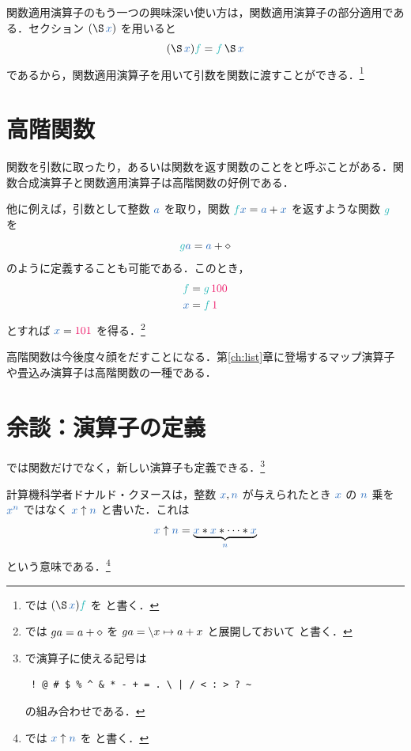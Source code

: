 \documentclass[a5paper,twoside,fleqn,draft]{jsbook}
\begin{document}
関数適用演算子のもう一つの興味深い使い方は，関数適用演算子の部分適用である．セクション $(\hApply\hVar{x})$ を用いると
\begin{equation}
  (\hApply\hVar{x})\hFunc{f}
  =\hFunc{f}\hApply\hVar{x}
\end{equation}
であるから，関数適用演算子を用いて引数を関数に渡すことができる．\footnote{\haskell では $(\hApply\hVar{x})\hFunc{f}$ を  と書く．}

\section{高階関数}

関数を引数に取ったり，あるいは関数を返す関数のことをと呼ぶことがある．関数合成演算子と関数適用演算子は高階関数の好例である．

他に例えば，引数として整数 $\hVar{a}$ を取り，関数 $\hFunc{f}\hVar{x}=\hVar{a}+\hVar{x}$ を返すような関数 $\hFunc{g}$ を
\begin{equation}
  \hFunc{g}\hVar{a}
  =\hVar{a}+\hAnonParam
\end{equation}
のように定義することも可能である．このとき，
\begin{align}
  \hFunc{f}
  &=\hFunc{g}\,\hConstant{100}\\
  \hVar{x}
  &=\hFunc{f}\,\hConstant{1}
\end{align}
とすれば $\hVar{x}=\hConstant{101}$ を得る．\footnote{\haskell では $ga=a+\diamond$ を $ga=\backslash x\mapsto a+x$ と展開しておいて  と書く．}

高階関数は今後度々顔をだすことになる．第\ref{ch:list}章に登場するマップ演算子や畳込み演算子は高階関数の一種である．

\section{余談：演算子の定義}

\haskell では関数だけでなく，新しい演算子も定義できる．\footnote{\haskell で演算子に使える記号は
\begin{verbatim}
 ! @ # $ % ^ & * - + = . \ | / < : > ? ~
\end{verbatim}%
の組み合わせである．}


計算機科学者ドナルド・クヌースは，整数 $\hVar{x},\hVar{n}$ が与えられたとき $\hVar{x}$ の $\hVar{n}$ 乗を ${\hVar{x}}^{\hVar{n}}$ ではなく $\hVar{x}\uparrow\hVar{n}$ と書いた．これは
\begin{equation}
  \hVar{x}\uparrow\hVar{n}
  =\underbrace{\hVar{x}*\hVar{x}*\dotsb*\hVar{x}}_{\hVar{n}}
\end{equation}
という意味である．\footnote{\haskell では $\hVar{x}\uparrow\hVar{n}$ を  と書く．}
\end{document}
